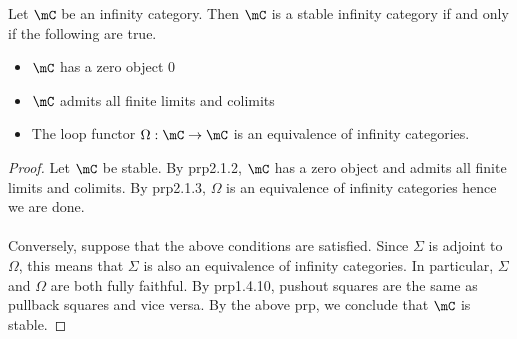 \documentclass[a4paper]{article}
\begin{document}
\begin{prp}{}{} Let $\mC$ be an infinity category. Then $\mC$ is a stable infinity category if and only if the following are true. 
\begin{itemize}
\item $\mC$ has a zero object $0$
\item $\mC$ admits all finite limits and colimits
\item The loop functor $\Omega:\mC\to\mC$ is an equivalence of infinity categories. 
\end{itemize} \tcbline
\begin{proof}
Let $\mC$ be stable. By prp2.1.2, $\mC$ has a zero object and admits all finite limits and colimits. By prp2.1.3, $\Omega$ is an equivalence of infinity categories hence we are done. \\~\\

Conversely, suppose that the above conditions are satisfied. Since $\Sigma$ is adjoint to $\Omega$, this means that $\Sigma$ is also an equivalence of infinity categories. In particular, $\Sigma$ and $\Omega$ are both fully faithful. By prp1.4.10, pushout squares are the same as pullback squares and vice versa. By the above prp, we conclude that $\mC$ is stable. 
\end{proof}
\end{prp}
\end{document}
